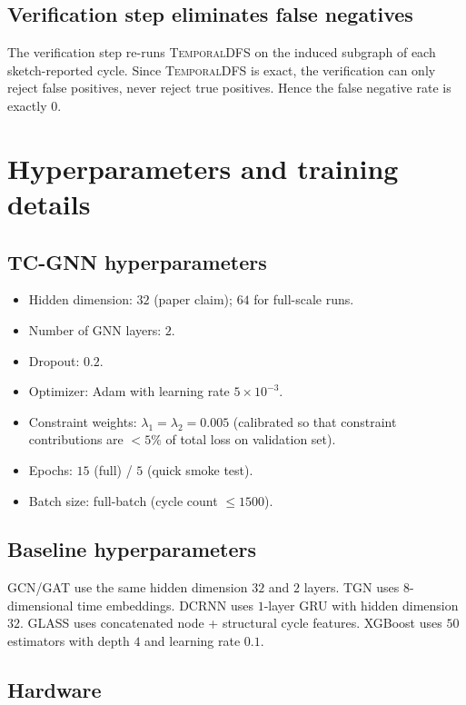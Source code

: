\documentclass[journal,onecolumn]{IEEEtran}
\begin{document}
\subsection{Verification step eliminates false negatives}

The verification step re-runs \textsc{TemporalDFS} on the induced subgraph
of each sketch-reported cycle. Since \textsc{TemporalDFS} is exact, the
verification can only reject false positives, never reject true positives.
Hence the false negative rate is exactly $0$.

\section{Hyperparameters and training details}
\label{sec:appx-hp}

\subsection{TC-GNN hyperparameters}

\begin{itemize}
\item Hidden dimension: $32$ (paper claim); $64$ for full-scale runs.
\item Number of GNN layers: $2$.
\item Dropout: $0.2$.
\item Optimizer: Adam with learning rate $5 \times 10^{-3}$.
\item Constraint weights: $\lambda_1 = \lambda_2 = 0.005$ (calibrated so
      that constraint contributions are $< 5\%$ of total loss on
      validation set).
\item Epochs: $15$ (full) / $5$ (quick smoke test).
\item Batch size: full-batch (cycle count $\le 1500$).
\end{itemize}

\subsection{Baseline hyperparameters}

GCN/GAT use the same hidden dimension $32$ and $2$ layers. TGN uses
$8$-dimensional time embeddings. DCRNN uses $1$-layer GRU with hidden
dimension $32$. GLASS uses concatenated node + structural cycle features.
XGBoost uses $50$ estimators with depth $4$ and learning rate $0.1$.

\subsection{Hardware}
\end{document}
